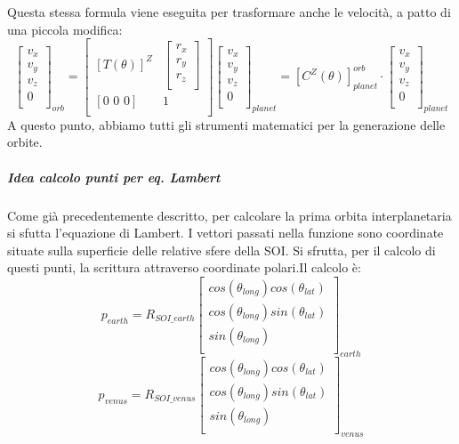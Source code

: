 \documentclass[a4paper]{article}
\begin{document}
Questa stessa formula viene eseguita per trasformare anche le velocità, a patto di una piccola modifica:
\[
\begin{bmatrix}
v_{x} \\
v_{y} \\
v_{z} \\
0 \\
\end{bmatrix}_{orb} = \begin{bmatrix}
[T(\theta)]^{Z} & \begin{bmatrix}
r_{x} \\
r_{y} \\
r_{z} \\
\end{bmatrix} \\
[\text{0  0  0}] & 1 \\
\end{bmatrix} \begin{bmatrix}
v_{x} \\
v_{y} \\
v_{z} \\
0 \\
\end{bmatrix}_{planet} = [C^{Z}(\theta)]_{planet}^{orb} \cdot \begin{bmatrix}
v_{x} \\
v_{y} \\
v_{z} \\
0 \\
\end{bmatrix}_{planet}
\]
A questo punto, abbiamo tutti gli strumenti matematici per la generazione delle orbite.
\subparagraph{Idea calcolo punti per eq. Lambert\newline}
Come già precedentemente descritto, per calcolare la prima orbita interplanetaria si sfutta l'equazione di Lambert. I vettori passati nella funzione sono coordinate situate sulla superficie delle relative sfere della SOI. Si sfrutta, per il calcolo di questi punti, la scrittura attraverso coordinate polari.\newline Il calcolo è:
\[
p_{earth} = R_{SOI\_earth}\begin{bmatrix}
cos(\theta_{long})cos(\theta_{lat}) \\
cos(\theta_{long})sin(\theta_{lat}) \\
sin(\theta_{long}) \\
\end{bmatrix}_{earth}
\]
\[
p_{venus} = R_{SOI\_venus}\begin{bmatrix}
cos(\theta_{long})cos(\theta_{lat}) \\
cos(\theta_{long})sin(\theta_{lat}) \\
sin(\theta_{long}) \\
\end{bmatrix}_{venus}
\]
\end{document}
